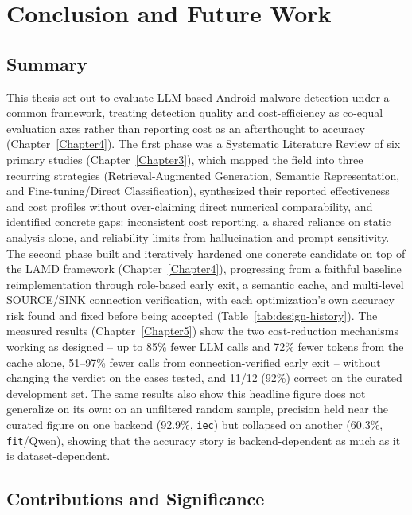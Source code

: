 \chapter{Conclusion and Future Work}
\label{Chapter6}

\section{Summary}

This thesis set out to evaluate LLM-based Android malware detection under a
common framework, treating detection quality and cost-efficiency as
co-equal evaluation axes rather than reporting cost as an afterthought to
accuracy (Chapter~\ref{Chapter4}). The first phase was a Systematic
Literature Review of six primary studies (Chapter~\ref{Chapter3}), which
mapped the field into three recurring strategies (Retrieval-Augmented
Generation, Semantic Representation, and Fine-tuning/Direct
Classification), synthesized their reported effectiveness and cost
profiles without over-claiming direct numerical comparability, and
identified concrete gaps: inconsistent cost reporting, a shared reliance
on static analysis alone, and reliability limits from hallucination and
prompt sensitivity. The second phase built and iteratively hardened one
concrete candidate on top of the LAMD framework (Chapter~\ref{Chapter4}),
progressing from a faithful baseline reimplementation through role-based
early exit, a semantic cache, and multi-level SOURCE/SINK connection
verification, with each optimization's own accuracy risk found and fixed
before being accepted (Table~\ref{tab:design-history}). The measured
results (Chapter~\ref{Chapter5}) show the two cost-reduction mechanisms
working as designed -- up to 85\% fewer LLM calls and 72\% fewer tokens
from the cache alone, 51--97\% fewer calls from connection-verified early
exit -- without changing the verdict on the cases tested, and 11/12 (92\%)
correct on the curated development set. The same results also show this
headline figure does not generalize on its own: on an unfiltered random
sample, precision held near the curated figure on one backend (92.9\%,
\texttt{iec}) but collapsed on another (60.3\%, \texttt{fit}/Qwen), showing
that the accuracy story is backend-dependent as much as it is
dataset-dependent.

\section{Contributions and Significance}

